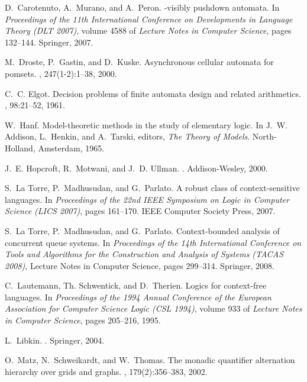 \documentclass{LMCS}
\begin{document}
\begin{exa}
{{
D.~Carotenuto, A.~Murano, and A.~Peron.
-visibly pushdown automata.
\newblock In {\em Proceedings of the 11th International Conference on
  Developments in Language Theory (DLT 2007)}, volume 4588 of {\em Lecture
  Notes in Computer Science}, pages 132--144. Springer, 2007.

M.~Droste, P.~Gastin, and D.~Kuske.
\newblock Asynchronous cellular automata for pomsets.
, 247(1-2):1--38, 2000.

C.~C. Elgot.
\newblock Decision problems of finite automata design and related arithmetics.
, 98:21--52, 1961.

W.~Hanf.
\newblock Model-theoretic methods in the study of elementary logic.
\newblock In J.~W. Addison, L.~Henkin, and A.~Tarski, editors, {\em The Theory
  of Models}. North-Holland, Amsterdam, 1965.

J.~E. Hopcroft, R.~Motwani, and J.~D. Ullman.
.
\newblock Addison-Wesley, 2000.

S.~{La Torre}, P.~Madhusudan, and G.~Parlato.
\newblock A robust class of context-sensitive languages.
\newblock In {\em Proceedings of the 22nd IEEE Symposium on Logic in Computer
  Science (LICS 2007)}, pages 161--170. IEEE Computer Society Press, 2007.

S.~{La Torre}, P.~Madhusudan, and G.~Parlato.
\newblock Context-bounded analysis of concurrent queue systems.
\newblock In {\em Proceedings of the 14th International Conference on Tools and
  Algorithms for the Construction and Analysis of Systems (TACAS 2008)},
  Lecture Notes in Computer Science, pages 299--314. Springer, 2008.

C.~Lautemann, Th. Schwentick, and D.~Therien.
\newblock Logics for context-free languages.
\newblock In {\em {Proceedings of the 1994 Annual Conference of the European
  Association for Computer Science Logic (CSL 1994)}}, volume 933 of {\em
  Lecture Notes in Computer Science}, pages 205--216, 1995.

L.~Libkin.
.
\newblock Springer, 2004.

O.~Matz, N.~Schweikardt, and W.~Thomas.
\newblock The monadic quantifier alternation hierarchy over grids and graphs.
, 179(2):356--383, 2002.

}}
\end{exa}
\end{document}
